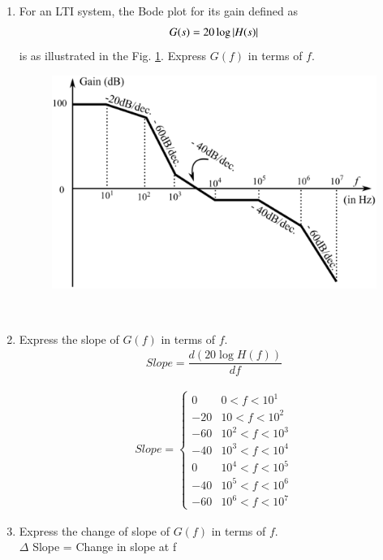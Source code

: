 \begin{enumerate}[label=\thesection.\arabic*.,ref=\thesection.\theenumi]

\item For an LTI system, the Bode plot for its gain defined as
\begin{align}
G(s) = 20\log\abs{H(s)}
\label{eq:ee18btech11001_gain}
\end{align}
is as illustrated in the Fig. \ref{fig:ee18btech11001_bode}. Express $G(f)$ in terms of $f$.
\begin{figure}[ht!]
    \centering
    \includegraphics[width=\columnwidth]{./figs/ee18btech11001/ee18btech11001.eps}
    \caption{}
    \label{fig:ee18btech11001_bode}
\end{figure}
\\
\solution 
\item Express the slope of $G(f)$ in terms of $f$.
\\
\solution
\begin{align}
Slope = \dfrac{d(20\log H(f))}{df}
\end{align}

\begin{align}
 Slope = 
 \begin{cases} 
        0 & 0 < f < 10^{1} \\
      -20 & 10 < f < 10^{2} \\
      -60 & 10^{2} < f < 10^{3} \\
      -40 & 10^{3} < f < 10^{4} \\
       0 & 10^{4} < f < 10^{5} \\
      -40 & 10^{5} < f < 10^{6} \\
      -60 & 10^{6} < f < 10^{7}   
 \end{cases}
\end{align}
%
\item Express the change of slope of $G(f)$ in terms of $f$.
\\
\solution
$ \Delta$ Slope = Change in slope at f


\end{enumerate}
